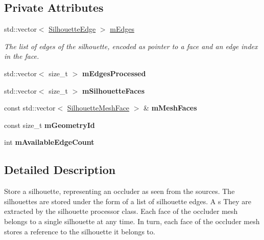\subsection*{Private Attributes}
\begin{DoxyCompactItemize}
\item 
\mbox{\label{classvisilib_1_1_silhouette_aa22b9c394c4ba8574cc1ac963b21e7e4}} 
std\+::vector$<$ \mbox{\hyperlink{structvisilib_1_1_silhouette_edge}{Silhouette\+Edge}} $>$ \mbox{\hyperlink{classvisilib_1_1_silhouette_aa22b9c394c4ba8574cc1ac963b21e7e4}{m\+Edges}}
\begin{DoxyCompactList}\small\item\em The list of edges of the silhouette, encoded as pointer to a face and an edge index in the face. \end{DoxyCompactList}\item 
\mbox{\label{classvisilib_1_1_silhouette_a35303f7e0d03e82cc1d956041434fd2b}} 
std\+::vector$<$ size\+\_\+t $>$ {\bfseries m\+Edges\+Processed}
\item 
\mbox{\label{classvisilib_1_1_silhouette_a2ae7ada30bb33142bdb1f72274e69d65}} 
std\+::vector$<$ size\+\_\+t $>$ {\bfseries m\+Silhouette\+Faces}
\item 
\mbox{\label{classvisilib_1_1_silhouette_af76d6b4b352e9c6a6e3a5bce7bc2c404}} 
const std\+::vector$<$ \mbox{\hyperlink{classvisilib_1_1_silhouette_mesh_face}{Silhouette\+Mesh\+Face}} $>$ \& {\bfseries m\+Mesh\+Faces}
\item 
\mbox{\label{classvisilib_1_1_silhouette_aff4fbf8a8c0bebd0487361b86002c4c2}} 
const size\+\_\+t {\bfseries m\+Geometry\+Id}
\item 
\mbox{\label{classvisilib_1_1_silhouette_a2f7534ae12c9330404adfc1a8a713f6a}} 
int {\bfseries m\+Available\+Edge\+Count}
\end{DoxyCompactItemize}


\subsection{Detailed Description}
Store a silhouette, representing an occluder as seen from the sources. The silhouettes are stored under the form of a list of silhouette edges. A s They are extracted by the silhouette processor class. Each face of the occluder mesh belongs to a single silhouette at any time. In turn, each face of the occluder mesh stores a reference to the silhouette it belongs to. 


